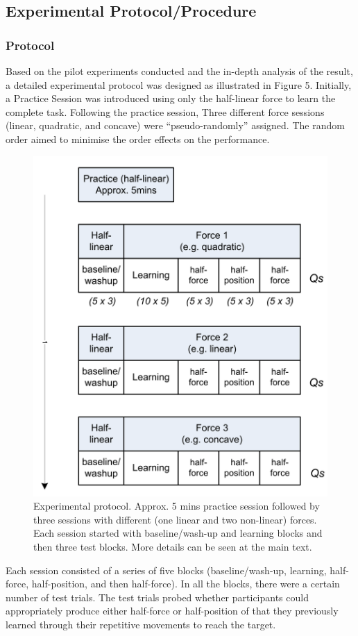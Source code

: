 \subsection{Experimental Protocol/Procedure}

\subsubsection{Protocol}
Based on the pilot experiments conducted and the in-depth analysis of the result, a detailed experimental protocol was designed as illustrated in Figure 5. Initially, a Practice Session was introduced using only the half-linear force to learn the complete task. Following the practice session, Three different force sessions (linear, quadratic, and concave) were “pseudo-randomly” assigned. The random order aimed to minimise the order effects on the performance.
\begin{figure}
	\centering
	\includegraphics[width=.7\textwidth]{Chie/figs/Figure5.png}
	\caption{Experimental protocol. Approx. 5 mins practice session followed by three sessions with different (one linear and two non-linear) forces. Each session started with baseline/wash-up and learning blocks and then three test blocks. More details can be seen at the main text.}
	\label{protocol}
\end{figure}
Each session consisted of a series of five blocks (baseline/wash-up, learning, half-force, half-position, and then half-force). In all the blocks, there were a certain number of test trials. The test trials probed whether participants could appropriately produce either half-force or half-position of that they previously learned through their repetitive movements to reach the target.

